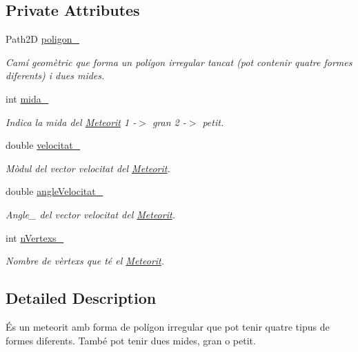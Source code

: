 \subsection*{Private Attributes}
\begin{DoxyCompactItemize}
\item 
Path2\+D \hyperlink{class_meteorit_a1dd8a11e4ec8c806ee66a50773daeaf7}{poligon\+\_\+}
\begin{DoxyCompactList}\small\item\em Camí geomètric que forma un polígon irregular tancat (pot contenir quatre formes diferents) i dues mides. \end{DoxyCompactList}\item 
int \hyperlink{class_meteorit_a8edd607e17be6537c15ab04bfd29dc52}{mida\+\_\+}
\begin{DoxyCompactList}\small\item\em Indica la mida del \hyperlink{class_meteorit}{Meteorit} 1 -\/$>$ gran 2 -\/$>$ petit. \end{DoxyCompactList}\item 
double \hyperlink{class_meteorit_a6d567bfb1f4d118c6c36c7bff76ec28a}{velocitat\+\_\+}
\begin{DoxyCompactList}\small\item\em Mòdul del vector velocitat del \hyperlink{class_meteorit}{Meteorit}. \end{DoxyCompactList}\item 
double \hyperlink{class_meteorit_ae642e495aeb2d78122cb2ae550dde61b}{angle\+Velocitat\+\_\+}
\begin{DoxyCompactList}\small\item\em Angle\+\_\+ del vector velocitat del \hyperlink{class_meteorit}{Meteorit}. \end{DoxyCompactList}\item 
int \hyperlink{class_meteorit_a3b015faa09e271a0e54de95d1c9716c6}{n\+Vertexs\+\_\+}
\begin{DoxyCompactList}\small\item\em Nombre de vèrtexs que té el \hyperlink{class_meteorit}{Meteorit}. \end{DoxyCompactList}\end{DoxyCompactItemize}


\subsection{Detailed Description}
És un meteorit amb forma de polígon irregular que pot tenir quatre tipus de formes diferents. També pot tenir dues mides, gran o petit. 

